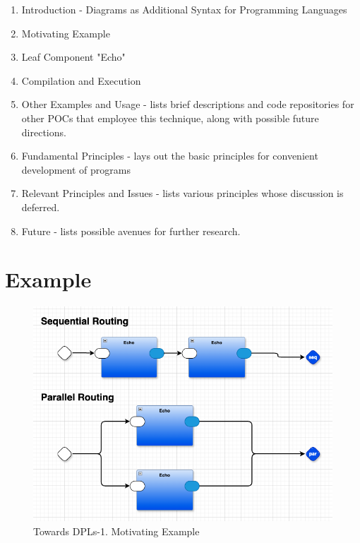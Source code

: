 \documentclass[10pt]{acmart}
\begin{document}
\begin{enumerate}
\item Introduction - Diagrams as Additional Syntax for Programming
Languages

\item Motivating Example

\item Leaf Component "Echo"

\item Compilation and Execution

\item Other Examples and Usage - lists brief descriptions and
code repositories for other POCs that employee this technique, along
with possible future directions.

\item Fundamental Principles - lays out the basic principles
for convenient development of programs

\item Relevant Principles and Issues - lists various
principles whose discussion is deferred.

\item Future - lists possible avenues for further research.

\end{enumerate}

\section{Example}

  \begin{figure}[h]
    \centering
    \includegraphics[width=0.8\linewidth]{./media/HelloWorld0D.png}
    \caption{Towards DPLs-1. Motivating Example}
    \label{fig:convert_to_json}
  \end{figure}
\end{document}
